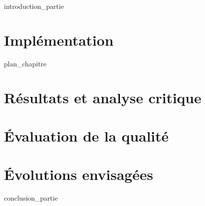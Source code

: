\label{part:01_int}
{introduction_partie}
%
\chapter{Implémentation }
\label{chap:09}
{plan_chapitre}
%
\chapter{Résultats et analyse critique }
\label{chap:10}
%
\chapter{Évaluation de la qualité }
\label{chap:11}
%
\chapter{Évolutions envisagées }
\label{chap:12}
%
\label{part:01_cnc}
{conclusion_partie}
